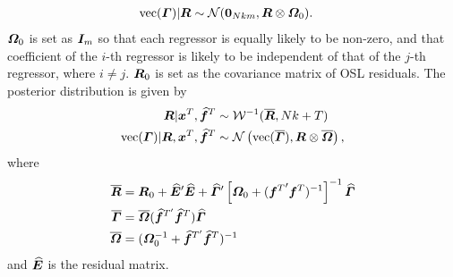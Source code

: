 \begin{enumerate}
\begin{enumerate}
\begin{align}
	\operatorname{vec}(\bm \varGamma)|\bm R&\sim\mathcal{N}(\boldsymbol{0}_{Nkm},\bm R\otimes\bm \varOmega_0).
\end{align}
$\bm \varOmega_0$ is set as $\bm I_m$ so that each regressor is equally likely to be non-zero, and that coefficient of the $i$-th regressor is likely to be independent of that of the $j$-th regressor, where $i\ne j$. $\bm R_0$ is set as the covariance matrix of OSL residuals. The posterior distribution is given by
\begin{align}
	\bm R|\bm x^T,\widehat{\bm f}^T&\sim\mathcal{W}^{-1}(\overline{\bm R},Nk+T)\\
	\operatorname{vec}(\bm \varGamma)|\bm R,\bm x^T,\widehat{\bm f}^T&\sim\mathcal{N}\left(\operatorname{vec}(\overline{\bm \varGamma}),\bm R\otimes\overline{\bm \varOmega}\right),
\end{align}
where
\begin{align}
	\overline{\bm R}&=\bm R_0+\widehat{\bm E}'\widehat{\bm E}+\widehat{\bm \varGamma}'\left[\bm \varOmega_0+({\bm f^T}'\bm f^T)^{-1}\right]^{-1}\widehat{\bm \varGamma}\\
	\overline{\bm \varGamma}&=\overline{\bm \varOmega}(\widehat{\bm f}^{T'}\widehat{\bm f}^T)\widehat{\bm \varGamma}\\
	\overline{\bm \varOmega}&=(\bm \varOmega_0^{-1}+\widehat{\bm f}^{T'}\widehat{\bm f}^T)^{-1}
\end{align}
and $\widehat{\bm E}$ is the residual matrix.


\end{enumerate}
\end{enumerate}
